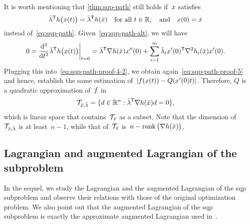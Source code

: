 It is worth mentioning that \cref{thm:sqp-path} still holds if~$\iter$ satisfies
\begin{equation}
    \label{eq:sqp-path-alt}
    \bar{\lm}^{\T} h \big( \iter(t) \big) = \bar{\lm}^{\T} h(\bar{\iter}) \quad \text{for all~$t \in \R$}, \quad \text{and} \quad \iter(0) = \bar{\iter}
\end{equation}
instead of~\cref{eq:sqp-path}.
Given~\cref{eq:sqp-path-alt}, we will have
\begin{equation*}
    0 = \frac{\du^2}{\du t^2} \bar{\lm}^{\T} h \big( \iter(t) \big) \bigg\vert_{t = 0} = \bar{\lm}^{\T} \nabla h(\bar{\iter}) \iter''(0) + \sum_{i = 1}^m \bar{\lm}_i \iter'(0)^{\T} \nabla^2 h_i(\bar{\iter}) \iter'(0).
\end{equation*}
Plugging this into~\cref{eq:sqp-path-proof-4-2}, we obtain again~\cref{eq:sqp-path-proof-5} and hence, establish the same estimation of~$\abs{\obj(\iter(t)) - Q(x'(0) t)}$.
Therefore, $Q$ is a quadratic approximation of~$f$ in
\begin{equation*}
    \mathcal{T}_{\bar{\iter}, \bar{\lm}} = \set{\step \in \R^n : \bar{\lm}^{\T} \nabla h(\bar{\iter}) \step = 0},
\end{equation*}
which is linear space that contains~$\mathcal{T}_{\bar{\iter}}$ as a subset.
Note that the dimension of~$\mathcal{T}_{\bar{\iter}, \bar{\lm}}$ is at least~$n - 1$, while that of~$\mathcal{T}_{\bar{\iter}}$ is~$n - \rank \big( \nabla h(\bar{\iter}) \big)$.

\subsection{Lagrangian and augmented Lagrangian of the  subproblem}
\label{subsec:lagrangian-augmented-lagrangian}

In the sequel, we study the Lagrangian and the augmented Lagrangian of the \gls{sqp} subproblem and observe their relations with those of the original optimization problem.
We also point out that the augmented Lagrangian of the \gls{sqp} subproblem is exactly the approximate augmented Lagrangian used in~\cite{Niu_Yuan_2010,Wang_Yuan_2014}.

